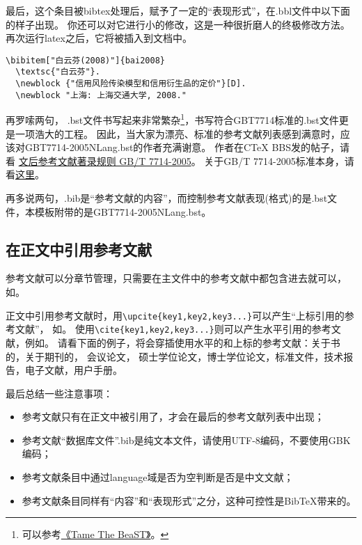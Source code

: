 最后，这个条目被bibtex处理后，赋予了一定的``表现形式''，在.bbl文件中以下面的样子出现。
你还可以对它进行小的修改，这是一种很折磨人的终极修改方法。
再次运行latex之后，它将被插入到文档中。

\begin{lstlisting}[caption={.bbl中被格式化之后的条目}, escapeinside="", numbers=none]
\bibitem["白云芬(2008)"]{bai2008}
  \textsc{"白云芬"}.
  \newblock {"信用风险传染模型和信用衍生品的定价"}[D].
  \newblock "上海: 上海交通大学, 2008."
\end{lstlisting}

再罗嗦两句，
.bst文件书写起来非常繁杂\footnote{可以参考\href{http://ftp.ctex.org/mirrors/CTAN/info/bibtex/tamethebeast/ttb_en.pdf}{《Tame The BeaST》}。}，书写符合GBT7714标准的.bst文件更是一项浩大的工程。
因此，当大家为漂亮、标准的参考文献列表感到满意时，应该对GBT7714-2005NLang.bst的作者充满谢意。
作者在CTeX BBS发的帖子，请看
\href{http://bbs.ctex.org/viewthread.php?tid=33571&highlight=\%B2\%CE\%BF\%BC\%CE\%C4\%CF\%D7\%2BGB}{文后参考文献著录规则 GB/T 7714-2005}。
关于GB/T 7714-2005标准本身，请看\href{http://bbs.ctex.org/viewthread.php?tid=33571&highlight=GB\%2B\%B2\%CE\%BF\%BC\%CE\%C4\%CF\%D7}{这里}。

再多说两句，.bib是“参考文献的内容”，而控制参考文献表现(格式)的是.bst文件，本模板附带的是GBT7714-2005NLang.bst。

\subsection{在正文中引用参考文献}

参考文献可以分章节管理，只需要在主文件中的参考文献中都包含进去就可以，如\verb++。

正文中引用参考文献时，用\verb+\upcite{key1,key2,key3...}+可以产生“上标引用的参考文献”，
如。
使用\verb+\cite{key1,key2,key3...}+则可以产生水平引用的参考文献，例如\cite{JohnD,zhubajie,IEEE-1363}。
请看下面的例子，将会穿插使用水平的和上标的参考文献：关于书的\cite{Meta_CN,JohnD,IEEE-1363}，关于期刊的，
会议论文\cite{DPMG,kocher99,cnproceed}，
硕士学位论文\cite{zhubajie,metamori2004}，博士学位论文，标准文件\cite{IEEE-1363}，技术报告，电子文献\cite{xiaoyu2001, CHRISTINE1998}，用户手册\cite{RManual}。

最后总结一些注意事项：
\begin{itemize}
\item 参考文献只有在正文中被引用了，才会在最后的参考文献列表中出现；
\item 参考文献``数据库文件''.bib是纯文本文件，请使用UTF-8编码，不要使用GBK编码；
\item 参考文献条目中通过language域是否为空判断是否是中文文献；
\item 参考文献条目同样有“内容”和“表现形式”之分，这种可控性是BibTeX带来的。
\end{itemize}


